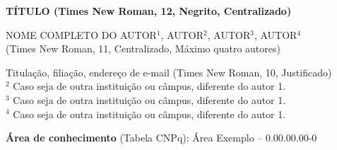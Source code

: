 \documentclass[11pt,a4paper]{article}
\begin{document}


\vspace{1cm}

{\fontsize{12}{12}\selectfont
\begin{center}
\textbf {TÍTULO (Times New Roman, 12, Negrito, Centralizado)}
\end{center}}

\begin{center}
  NOME COMPLETO DO AUTOR$^1$, AUTOR$^2$, AUTOR$^3$, AUTOR$^4$\\
 (Times New Roman, 11, Centralizado, Máximo quatro autores)
\end{center}

\begingroup
\sloppy
{\fontsize{10}{10}\selectfont
{} Titulação, filiação, endereço de e-mail (Times New Roman, 10, Justificado) %
\\
{$^2$}  Caso seja de outra instituição ou câmpus, diferente do autor 1.\\
{$^3$} Caso seja de outra instituição ou câmpus, diferente do autor 1.\\
{$^4$} Caso seja de outra instituição ou câmpus, diferente do autor 1.
}
\endgroup

{\fontsize{10}{10}\selectfont
{}}

\begin{center}
{\fontsize{10}{10}\selectfont 
\textbf{Área de conhecimento} (Tabela CNPq): Área Exemplo – 0.00.00.00-0}
\end{center}

\vspace{0.25cm}
\end{document}
